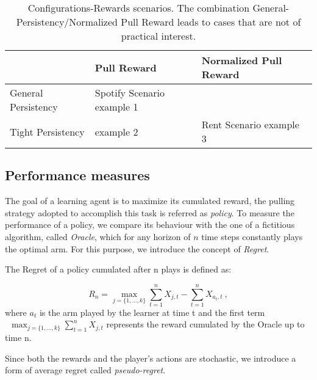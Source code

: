 \begin{table}

\begin{center}
	\caption{Configurations-Rewards scenarios. The combination General-Persistency/Normalized Pull Reward leads to cases that are not of practical interest.}\label{tabNF}
	\begin{tabularx}{0.8\textwidth} { 
			| >{\raggedright\arraybackslash}X 
			| >{\centering\arraybackslash}X 
			| >{\centering\arraybackslash}X | }
		\hline
		  & Pull Reward & Normalized Pull Reward \\
		\hline
		General Persistency  &  Spotify Scenario example 1 &   \\
		\hline
		Tight Persistency  & example 2  & 
			    Rent Scenario example 3
			 \\
		\hline		
	\end{tabularx}	
\end{center}

\end{table}




\subsection{ Performance measures}
The goal of a learning agent is to maximize its cumulated reward, the pulling strategy adopted to accomplish this task is referred as \emph{policy}. To measure the performance of a policy, we compare its behaviour with the one of a fictitious algorithm, called \emph{Oracle}, which for any horizon of $n$ time steps constantly plays the optimal arm. For this purpose, we introduce the concept of \emph{Regret}.
\begin{definition}[Regret]
	The Regret of a policy cumulated after n plays is defined as:
	
		$$R_n=\max_{j = \{1,\dots,k\}} \sum_{t=1}^n{X_{j,t}} - \sum_{t=1}^{n} X_{a_t,t}  \ ,$$
where  $a_t$ is the arm played by the learner at time t and the first term \\\ $\max_{j = \{1,\dots,k\}}\sum_{t=1}^n{X_{j,t}}$ represents the reward cumulated by the Oracle up to time n.

\end{definition}
Since both the rewards and the player's actions are stochastic, we introduce a form of average regret called \emph{pseudo-regret}.

